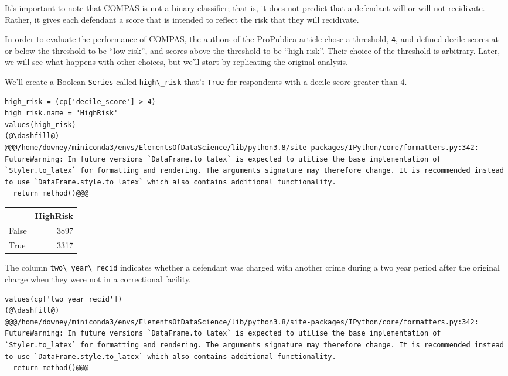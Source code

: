 It's important to note that COMPAS is not a binary classifier; that is,
it does not predict that a defendant will or will not recidivate.
Rather, it gives each defendant a score that is intended to reflect the
risk that they will recidivate.

In order to evaluate the performance of COMPAS, the authors of the
ProPublica article chose a threshold, \passthrough{\lstinline!4!}, and
defined decile scores at or below the threshold to be ``low risk'', and
scores above the threshold to be ``high risk''. Their choice of the
threshold is arbitrary. Later, we will see what happens with other
choices, but we'll start by replicating the original analysis.

We'll create a Boolean \passthrough{\lstinline!Series!} called
\passthrough{\lstinline!high\_risk!} that's
\passthrough{\lstinline!True!} for respondents with a decile score
greater than 4.

\begin{lstlisting}[]
high_risk = (cp['decile_score'] > 4)
high_risk.name = 'HighRisk'
values(high_risk)
(@\dashfill@)
@@@/home/downey/miniconda3/envs/ElementsOfDataScience/lib/python3.8/site-packages/IPython/core/formatters.py:342: FutureWarning: In future versions `DataFrame.to_latex` is expected to utilise the base implementation of `Styler.to_latex` for formatting and rendering. The arguments signature may therefore change. It is recommended instead to use `DataFrame.style.to_latex` which also contains additional functionality.
  return method()@@@
\end{lstlisting}

\begin{tabular}{lr}
\midrule
{} &  HighRisk \\
\midrule
False &      3897 \\
True  &      3317 \\
\midrule
\end{tabular}

The column \passthrough{\lstinline!two\_year\_recid!} indicates whether
a defendant was charged with another crime during a two year period
after the original charge when they were not in a correctional facility.

\begin{lstlisting}[]
values(cp['two_year_recid'])
(@\dashfill@)
@@@/home/downey/miniconda3/envs/ElementsOfDataScience/lib/python3.8/site-packages/IPython/core/formatters.py:342: FutureWarning: In future versions `DataFrame.to_latex` is expected to utilise the base implementation of `Styler.to_latex` for formatting and rendering. The arguments signature may therefore change. It is recommended instead to use `DataFrame.style.to_latex` which also contains additional functionality.
  return method()@@@
\end{lstlisting}

